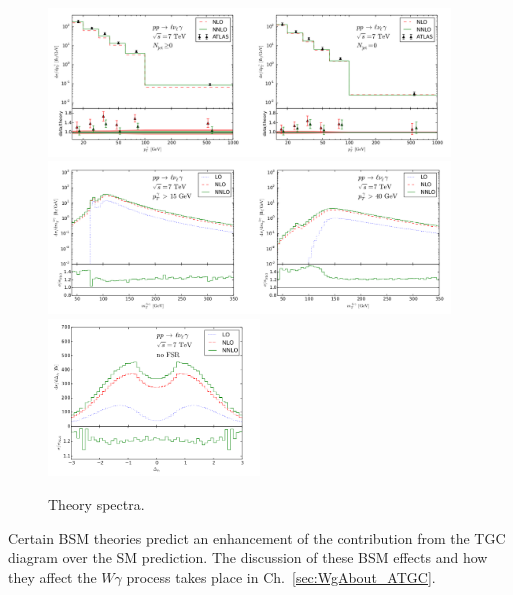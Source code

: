 \begin{figure}[htb]
  \begin{center}
    {\includegraphics[width=0.95\textwidth]{../figs/WgAbout/Theory_NNLO_PtGamma.png}}    
    {\includegraphics[width=0.95\textwidth]{../figs/WgAbout/Theory_NNLO_mT_finer.png}}
    {\includegraphics[width=0.50\textwidth]{../figs/WgAbout/Theory_NNLO_rapidity.png}}
    \caption{Theory spectra.}
    \label{fig:Theory_NNLO_and_other}
  \end{center}
\end{figure}

Certain BSM theories predict an enhancement of the contribution from the TGC diagram over the SM prediction. The discussion of these BSM effects and how they affect the $W\gamma$ process takes place in Ch.~\ref{sec:WgAbout_ATGC}.\\ 

